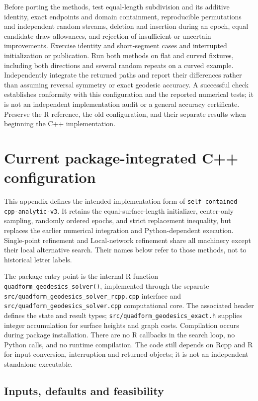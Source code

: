 \documentclass[11pt,letterpaper]{article}
\newcommand{\src}[1]{\nolinkurl{#1}}
\begin{document}
Before porting the methods, test equal-length subdivision and its additive
identity, exact endpoints and domain containment, reproducible permutations
and independent random streams, deletion and insertion during an epoch, equal
candidate draw allowances, and rejection of insufficient or uncertain
improvements. Exercise identity and short-segment cases and interrupted
initialization or publication. Run both methods on flat and curved fixtures,
including both directions and several random repeats on a curved example.
Independently integrate the returned paths and report their differences rather
than assuming reversal symmetry or exact geodesic accuracy. A successful check
establishes conformity with this configuration and the reported numerical
tests; it is not an independent implementation audit or a general accuracy
certificate. Preserve the R reference, the old configuration, and their
separate results when beginning the C++ implementation.

\clearpage
\section{Current package-integrated C++ configuration}
\label{app:cpp-current}

This appendix defines the intended implementation form of
\src{self-contained-cpp-analytic-v3}. It retains the equal-surface-length
initializer, center-only sampling, randomly ordered epochs, and strict
replacement inequality, but replaces the earlier numerical integration and
Python-dependent execution. Single-point refinement and Local-network
refinement share all machinery except their local alternative search.
Their names below refer to those methods, not to historical letter labels.

The package entry point is the internal R function
\src{quadform_geodesics_solver()}, implemented through the separate
\src{src/quadform_geodesics_solver_rcpp.cpp} interface and
\src{src/quadform_geodesics_solver.cpp} computational core. The associated
header defines the state and result types;
\src{src/quadform_geodesics_exact.h} supplies integer accumulation for
surface heights and graph costs. Compilation occurs during package
installation. There are no R callbacks in the search loop, no Python calls,
and no runtime compilation. The code still depends on Rcpp and R for input
conversion, interruption and returned objects; it is not an independent
standalone executable.

\subsection{Inputs, defaults and feasibility}
\label{sec:cpp-inputs}
\end{document}
